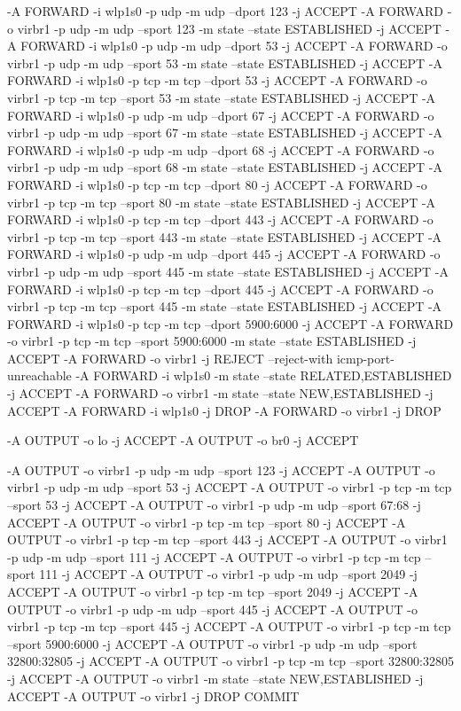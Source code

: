 \documentclass[mingoth,a4paper]{jsarticle}
\begin{document}
{{{{{{{{{{\begin{commandline}
-A FORWARD -i wlp1s0 -p udp -m udp --dport 123 -j ACCEPT
-A FORWARD -o virbr1 -p udp -m udp --sport 123 -m state --state ESTABLISHED -j ACCEPT
-A FORWARD -i wlp1s0 -p udp -m udp --dport 53 -j ACCEPT
-A FORWARD -o virbr1 -p udp -m udp --sport 53 -m state --state ESTABLISHED -j ACCEPT
-A FORWARD -i wlp1s0 -p tcp -m tcp --dport 53 -j ACCEPT
-A FORWARD -o virbr1 -p tcp -m tcp --sport 53 -m state --state ESTABLISHED -j ACCEPT
-A FORWARD -i wlp1s0 -p udp -m udp --dport 67 -j ACCEPT
-A FORWARD -o virbr1 -p udp -m udp --sport 67 -m state --state ESTABLISHED -j ACCEPT
-A FORWARD -i wlp1s0 -p udp -m udp --dport 68 -j ACCEPT
-A FORWARD -o virbr1 -p udp -m udp --sport 68 -m state --state ESTABLISHED -j ACCEPT
-A FORWARD -i wlp1s0 -p tcp -m tcp --dport 80 -j ACCEPT
-A FORWARD -o virbr1 -p tcp -m tcp --sport 80 -m state --state ESTABLISHED -j ACCEPT
-A FORWARD -i wlp1s0 -p tcp -m tcp --dport 443 -j ACCEPT
-A FORWARD -o virbr1 -p tcp -m tcp --sport 443 -m state --state ESTABLISHED -j ACCEPT
-A FORWARD -i wlp1s0 -p udp -m udp --dport 445 -j ACCEPT
-A FORWARD -o virbr1 -p udp -m udp --sport 445 -m state --state ESTABLISHED -j ACCEPT
-A FORWARD -i wlp1s0 -p tcp -m tcp --dport 445 -j ACCEPT
-A FORWARD -o virbr1 -p tcp -m tcp --sport 445 -m state --state ESTABLISHED -j ACCEPT
-A FORWARD -i wlp1s0 -p tcp -m tcp --dport 5900:6000 -j ACCEPT
-A FORWARD -o virbr1 -p tcp -m tcp --sport 5900:6000 -m state --state ESTABLISHED -j ACCEPT
-A FORWARD -o virbr1 -j REJECT --reject-with icmp-port-unreachable
-A FORWARD -i wlp1s0 -m state --state RELATED,ESTABLISHED -j ACCEPT
-A FORWARD -o virbr1 -m state --state NEW,ESTABLISHED -j ACCEPT
-A FORWARD -i wlp1s0 -j DROP
-A FORWARD -o virbr1 -j DROP

-A OUTPUT -o lo -j ACCEPT
-A OUTPUT -o br0 -j ACCEPT

-A OUTPUT -o virbr1 -p udp -m udp --sport 123 -j ACCEPT
-A OUTPUT -o virbr1 -p udp -m udp --sport 53 -j ACCEPT
-A OUTPUT -o virbr1 -p tcp -m tcp --sport 53 -j ACCEPT
-A OUTPUT -o virbr1 -p udp -m udp --sport 67:68 -j ACCEPT
-A OUTPUT -o virbr1 -p tcp -m tcp --sport 80 -j ACCEPT
-A OUTPUT -o virbr1 -p tcp -m tcp --sport 443 -j ACCEPT
-A OUTPUT -o virbr1 -p udp -m udp --sport 111 -j ACCEPT
-A OUTPUT -o virbr1 -p tcp -m tcp --sport 111 -j ACCEPT
-A OUTPUT -o virbr1 -p udp -m udp --sport 2049 -j ACCEPT
-A OUTPUT -o virbr1 -p tcp -m tcp --sport 2049 -j ACCEPT
-A OUTPUT -o virbr1 -p udp -m udp --sport 445 -j ACCEPT
-A OUTPUT -o virbr1 -p tcp -m tcp --sport 445 -j ACCEPT
-A OUTPUT -o virbr1 -p tcp -m tcp --sport 5900:6000 -j ACCEPT
-A OUTPUT -o virbr1 -p udp -m udp --sport 32800:32805 -j ACCEPT
-A OUTPUT -o virbr1 -p tcp -m tcp --sport 32800:32805 -j ACCEPT
-A OUTPUT -o virbr1 -m state --state NEW,ESTABLISHED -j ACCEPT
-A OUTPUT -o virbr1 -j DROP
COMMIT


\end{commandline}}}}}}}}}}}
\end{document}
